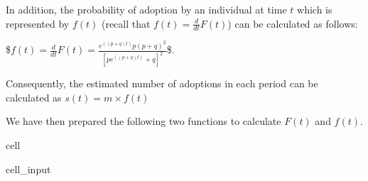 \documentclass[letterpaper,10pt,english]{jupyterBook}
\begin{document}
\sphinxAtStartPar
In addition, the probability of adoption by an individual at time \(t\) which is represented by \(f(t)\) (recall that \(f(t) = \frac{d}{dt}F(t)\)) can be calculated as follows:

\sphinxAtStartPar
\$\(f(t) = \frac{d}{dt}F(t) = \frac{e^{((p+q)t)}p(p+q)^2}{[pe^{((p+q)t)}+q]^2} \)\$.

\sphinxAtStartPar
Consequently, the estimated number of adoptions in each period can be calculated as  \(s(t) = m\times f(t)\)



\sphinxAtStartPar
We have then prepared the following two functions to calculate \(F(t)\) and \(f(t)\).

\begin{sphinxuseclass}{cell}\begin{sphinxVerbatimInput}

\begin{sphinxuseclass}{cell_input}
\begin{sphinxVerbatim}[commandchars=\\\{\}]
 
   
     

   
     
\end{sphinxVerbatim}

\end{sphinxuseclass}\end{sphinxVerbatimInput}

\end{sphinxuseclass}
\end{document}
